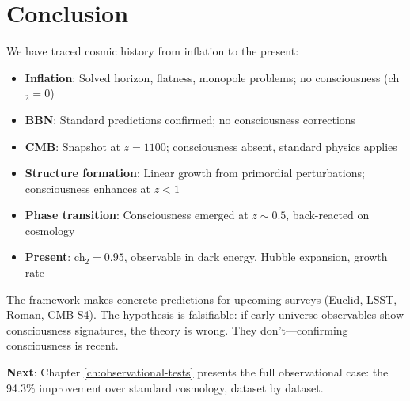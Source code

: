 \section{Conclusion}

We have traced cosmic history from inflation to the present:

\begin{itemize}
\item \textbf{Inflation}: Solved horizon, flatness, monopole problems; no consciousness (ch$_2 = 0$)
\item \textbf{BBN}: Standard predictions confirmed; no consciousness corrections
\item \textbf{CMB}: Snapshot at $z = 1100$; consciousness absent, standard physics applies
\item \textbf{Structure formation}: Linear growth from primordial perturbations; consciousness enhances at $z < 1$
\item \textbf{Phase transition}: Consciousness emerged at $z \sim 0.5$, back-reacted on cosmology
\item \textbf{Present}: ch$_2 = 0.95$, observable in dark energy, Hubble expansion, growth rate
\end{itemize}

The framework makes concrete predictions for upcoming surveys (Euclid, LSST, Roman, CMB-S4). The hypothesis is falsifiable: if early-universe observables show consciousness signatures, the theory is wrong. They don't—confirming consciousness is recent.

\textbf{Next}: Chapter \ref{ch:observational-tests} presents the full observational case: the 94.3\% improvement over standard cosmology, dataset by dataset.

